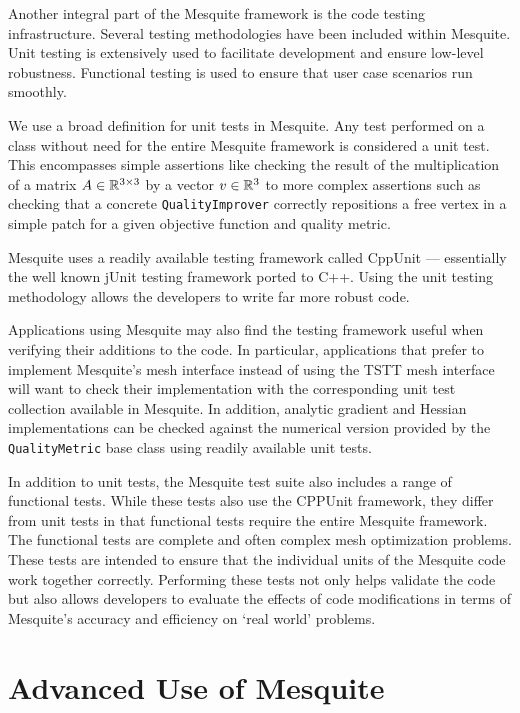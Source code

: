 \documentclass[psfig]{article}
\begin{document}
Another integral part of the Mesquite framework is the code testing
infrastructure.  Several testing methodologies have been included
within Mesquite. Unit testing is extensively used to facilitate
development and ensure low-level robustness. Functional testing is
used to ensure that user case scenarios run smoothly.

We use a broad definition for unit tests in Mesquite. Any test
performed on a class without need for the entire Mesquite framework is
considered a unit test. This encompasses simple assertions like
checking the result of the multiplication of a matrix $A \in
\Bbb{R}^{3 \times 3}$ by a vector $v \in \Bbb{R}^{3}$ to more complex
assertions such as checking that a concrete \texttt{QualityImprover}
correctly repositions a free vertex in a simple patch for a given
objective function and quality metric.

Mesquite uses a readily available testing framework called CppUnit
\cite{cppunit} --- essentially the well known jUnit testing framework
ported to C++.  Using the unit testing methodology allows the
developers to write far more robust code.

Applications using Mesquite may also find the testing framework useful
when verifying their additions to the code. In particular,
applications that prefer to implement Mesquite's mesh interface
instead of using the TSTT mesh interface will want to
check their implementation with the corresponding unit test collection
available in Mesquite. In addition, analytic gradient and Hessian
implementations can be checked against the numerical version provided
by the {\tt QualityMetric} base class using readily available unit
tests.

In addition to unit tests, the Mesquite test suite also includes
a range of functional tests.  While these tests also use the
CPPUnit framework, they differ from unit tests in that 
functional tests require the entire Mesquite framework.
The functional tests are complete and often complex mesh
optimization problems.  These tests are intended to ensure that
the individual units of the Mesquite code work together correctly.
Performing these tests not only helps
validate the code but also allows developers to evaluate the
effects of code modifications in terms of Mesquite's accuracy
and efficiency on `real world' problems.

\section{Advanced Use of Mesquite}
\end{document}
